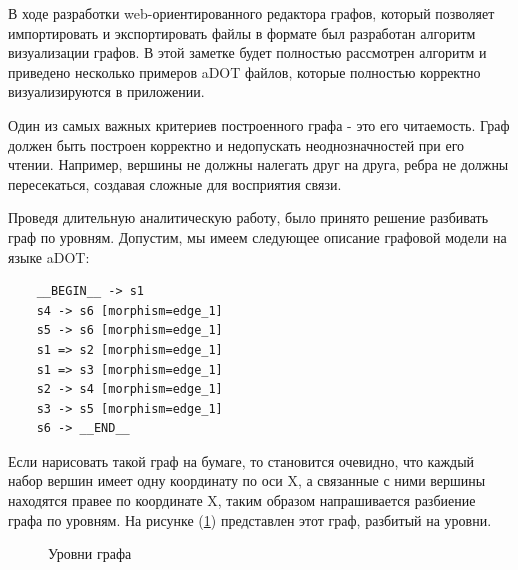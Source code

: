 \def\notedate{2021.04.12}
\def\currentauthor{Ершов В. (РК6-72Б)}

В ходе разработки web-ориентированного редактора графов, который позволяет импортировать и экспортировать файлы в формате был разработан алгоритм визуализации графов. В этой заметке будет полностью рассмотрен алгоритм и приведено несколько примеров aDOT файлов, которые полностью корректно визуализируются в приложении.

Один из самых важных критериев построенного графа - это его читаемость. Граф должен быть построен корректно и недопускать неоднозначностей при его чтении. Например, вершины не должны налегать друг на друга, ребра не должны пересекаться, создавая сложные для восприятия связи.

Проведя длительную аналитическую работу, было принято решение разбивать граф по уровням.
Допустим, мы имеем следующее описание графовой модели на языке aDOT:

\begin{verbatim}
	__BEGIN__ -> s1
	s4 -> s6 [morphism=edge_1]
	s5 -> s6 [morphism=edge_1]
	s1 => s2 [morphism=edge_1]
	s1 => s3 [morphism=edge_1]
	s2 -> s4 [morphism=edge_1]
	s3 -> s5 [morphism=edge_1]
	s6 -> __END__ 
\end{verbatim}

Если нарисовать такой граф на бумаге, то становится очевидно, что каждый набор вершин имеет одну координату по оси X, а связанные с ними вершины находятся правее по координате X, таким образом напрашивается разбиение графа по уровням. На рисунке (\ref{fig:graph_levels}) представлен этот граф, разбитый на уровни.

\begin{figure}[h!]
\caption{Уровни графа}
\label{fig:graph_levels}
\end{figure}

